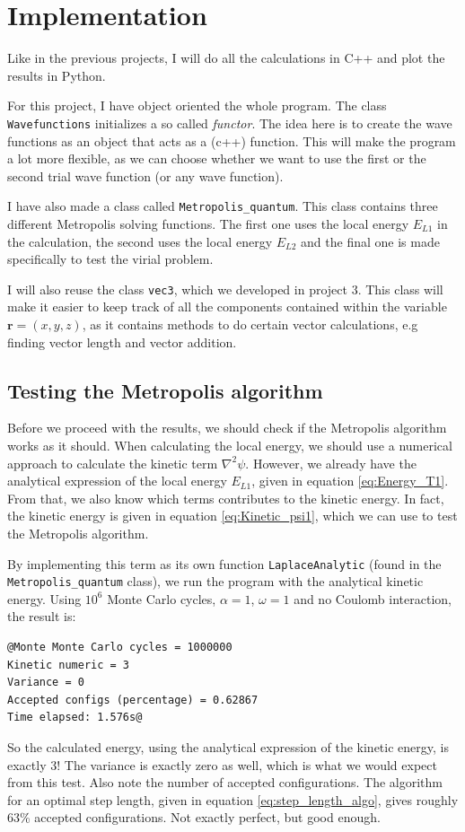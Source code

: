 \documentclass[12pt]{article}
\begin{document}
\section{Implementation} \label{section:implement}
Like in the previous projects, I will do all the calculations in C++ and plot the results in Python.

For this project, I have object oriented the whole program. The class\\ \texttt{Wavefunctions} initializes a so called \emph{functor}. The idea here is to create the wave functions as an object that acts as a (c++) function. This will make the program a lot more flexible, as we can choose whether we want to use the first or the second trial wave function (or any wave function).

I have also made a class called \texttt{Metropolis\_quantum}. This class contains three different Metropolis solving functions. The first one uses the local energy $E_{L1}$ in the calculation, the second uses the local energy $E_{L2}$ and the final one is made specifically to test the virial problem.

I will also reuse the class \texttt{vec3}, which we developed in project 3. This class will make it easier to keep track of all the components contained within the variable $\mathbf{r} = (x, y, z)$, as it contains methods to do certain vector calculations, e.g finding vector length and vector addition. 


\subsection{Testing the Metropolis algorithm}
Before we proceed with the results, we should check if the Metropolis algorithm works as it should. When calculating the local energy, we should use a numerical approach to calculate the kinetic term $\nabla^2\psi$. However, we already have the analytical expression of the local energy $E_{L1}$, given in equation \ref{eq:Energy_T1}. From that, we also know which terms contributes to the kinetic energy. In fact, the kinetic energy is given in equation \ref{eq:Kinetic_psi1}, which we can use to test the Metropolis algorithm.

By implementing this term as its own function \texttt{LaplaceAnalytic} (found in the \texttt{Metropolis\_quantum} class), we run the program with the analytical kinetic energy. Using $10^6$ Monte Carlo cycles, $\alpha = 1$, $\omega = 1$ and no Coulomb interaction, the result is:
\begin{lstlisting}
@Monte Monte Carlo cycles = 1000000
Kinetic numeric = 3
Variance = 0
Accepted configs (percentage) = 0.62867
Time elapsed: 1.576s@
\end{lstlisting}
So the calculated energy, using the analytical expression of the kinetic energy, is exactly 3! The variance is exactly zero as well, which is what we would expect from this test. Also note the number of accepted configurations. The algorithm for an optimal step length, given in equation \ref{eq:step_length_algo}, gives roughly 63\% accepted configurations. Not exactly perfect, but good enough.
\end{document}

